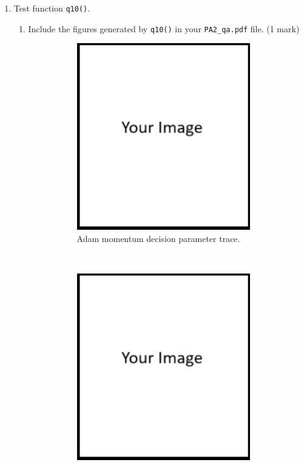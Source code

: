 \documentclass{article}
\theoremstyle{definition}
\newtheorem*{answer}{Answer}
\begin{document}
\begin{enumerate}[label=\ref{adam}.\alph*]
\begin{enumerate}[label=1.3.a.\roman*]
\begin{figure}[h]
\begin{subfigure}[t]{0.5\textwidth}
				\caption{Adam momentum Loss vs. iteration.}
			\end{subfigure}
			\caption{Figures generated by q9().}
		\end{figure}
		\item In 1-2 sentences, compare the performance of adam with momentum method (heavy-ball or Nestrov) (2 marks)
		\begin{answer}
			Your answer ...
		\end{answer}
	\end{enumerate}
	\newpage
	\item Test function \verb|q10()|.
	\begin{enumerate}[label=1.3.b.\roman*]
		\item Include the figures generated by \verb|q10()| in your \verb|PA2_qa.pdf| file. (1 mark)
		\begin{figure}[h]
			\centering
			\begin{subfigure}[t]{0.5\textwidth}
				\centering
				\includegraphics[height=3.2in]{image.png}
				\caption{Adam momentum decision parameter trace.}
			\end{subfigure}%
			~ 
			\begin{subfigure}[t]{0.5\textwidth}
				\centering
				\includegraphics[height=3.2in]{image.png}

\end{subfigure}
\end{figure}
\end{enumerate}
\end{enumerate}
\end{document}
